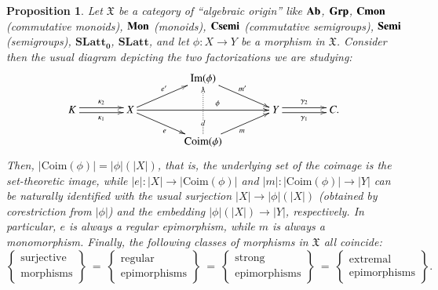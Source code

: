 \documentclass[12pt]{article}
\newtheorem{proposition}[lemma]{Proposition}
\theoremstyle{definition}
\def\X{\mathfrak X}
\def\Coim{\mathrm{Coim}}
\def\Im{\mathrm{Im}}
\newcommand{\Ab}{\textbf{\textup{Ab}}}
\newcommand{\Grp}{\textbf{\textup{Grp}}}
\newcommand{\Mon}{\textbf{\textup{Mon}}}
\newcommand{\Cmon}{\textbf{\textup{Cmon}}}
\newcommand{\Semi}{\textbf{\textup{Semi}}}
\newcommand{\Csemi}{\textbf{\textup{Csemi}}}
\newcommand{\SLatt}{\mathbf{SLatt_0}}
\newcommand{\SLattnobottom}{\mathbf{SLatt}}
\numberwithin{equation}{section}
\begin{document}
\begin{proposition}\label{algebraic_factorization_prop}
Let $\X$ be a category of ``algebraic origin'' like $\Ab$, $\Grp$, $\Cmon$ (commutative monoids), $\Mon$ (monoids), $\Csemi$ (commutative semigroups), $\Semi$ (semigroups), $\SLatt$, $\SLattnobottom$, and let $\phi\colon X\to Y$ be a morphism in $\X$. Consider then the usual diagram depicting the two factorizations we are studying: 
\[
\xymatrix@C=40pt@R=15pt{
 && \Im(\phi) \ar[dr]^{m'}  & & \\ 
K \ar@<-.5ex>[r]_-{\kappa_1} \ar@<.5ex>[r]^-{\kappa_2} &X \ar[ru]^{e'} \ar[rr]^(0.6){\phi}\ar[dr]_{e}&  & Y \ar@<-.5ex>[r]_-{\gamma_1} \ar@<.5ex>[r]^-{\gamma_2} & C.\\
& & \Coim(\phi) \ar[ur]_{m} \ar@{.>}[uu]|(0.3){d}  &  &
}
\]
Then, $|\Coim(\phi)|=|\phi|(|X|)$, that is, the underlying set of the coimage is the set-theoretic image, while $|e|\colon |X|\to |\Coim(\phi)|$ and $|m|\colon |\Coim(\phi)|\to |Y|$ can be naturally identified with the usual surjection $|X|\to |\phi|(|X|)$ (obtained by corestriction from $|\phi|$) and the embedding $|\phi|(|X|)\to |Y|$, respectively. In particular, $e$ is always a regular epimorphism, while $m$ is always a monomorphism. Finally, the following classes of morphisms in $\X$ all coincide:
\[
\left\{ \begin{matrix}\text{surjective}\\\text{morphisms}\end{matrix}\right\}\ \overset{}=\ \left\{ \begin{matrix}\text{regular}\\\text{epimorphisms}\end{matrix}\right\}\ \overset{}=\ \left\{ \begin{matrix}\text{strong}\\\text{epimorphisms}\end{matrix}\right\}\ \overset{}=\ \left\{ \begin{matrix}\text{extremal}\\\text{epimorphisms}\end{matrix}\right\}.
\]
\end{proposition} 
\end{document}
